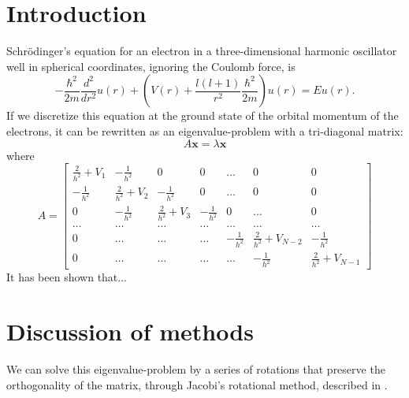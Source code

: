 \documentclass[a4paper]{article}
\begin{document}
\section{Introduction}\label{sec:intro}
Schrödinger's equation for an electron in a three-dimensional harmonic oscillator well in spherical coordinates, ignoring the Coulomb force, is
\begin{equation}
  -\frac{\hbar^2}{2 m} \frac{d^2}{dr^2} u(r)
       + \left ( V(r) + \frac{l (l + 1)}{r^2}\frac{\hbar^2}{2 m}
                                    \right ) u(r)  = E u(r) .
\end{equation}
If we discretize this equation at the ground state of the orbital momentum of the electrons, it can be rewritten \cite{fys3150_project2} as an eigenvalue-problem with a tri-diagonal matrix:
\begin{equation*}
A\textbf{x} = \lambda \textbf{x}
\end{equation*}
where
\begin{equation*}
A = \begin{bmatrix} \frac{2}{h^2}+V_1 & -\frac{1}{h^2} & 0   & 0    & \dots  &0     & 0 \\
                                -\frac{1}{h^2} & \frac{2}{h^2}+V_2 & -\frac{1}{h^2} & 0    & \dots  &0     &0 \\
                                0   & -\frac{1}{h^2} & \frac{2}{h^2}+V_3 & -\frac{1}{h^2}  &0       &\dots & 0\\
                                \dots  & \dots & \dots & \dots  &\dots      &\dots & \dots\\
                                0   & \dots & \dots & \dots  &-\frac{1}{h^2}  &\frac{2}{h^2}+V_{N-2} & -\frac{1}{h^2}\\
                                0   & \dots & \dots & \dots  &\dots       &-\frac{1}{h^2} & \frac{2}{h^2}+V_{N-1}
             \end{bmatrix}
\end{equation*}
It has been shown \cite{mhj_lecture_notes} that...

\section{Discussion of methods}\label{sec:methods}
We can solve this eigenvalue-problem by a series of rotations that preserve the orthogonality of the matrix, through Jacobi's rotational method, described in \cite{mhj_lecture_notes}.
\end{document}
